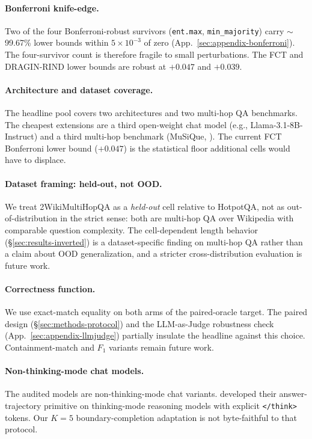 \documentclass[11pt]{article}
\begin{document}
\paragraph{Bonferroni knife-edge.} Two of the four Bonferroni-robust survivors (\texttt{ent.max}, \texttt{min\_majority}) carry $\sim$99.67\% lower bounds within $5{\times}10^{-3}$ of zero (App.~\ref{sec:appendix-bonferroni}). The four-survivor count is therefore fragile to small perturbations. The FCT and DRAGIN-RIND lower bounds are robust at $+0.047$ and $+0.039$.

\paragraph{Architecture and dataset coverage.} The headline pool covers two architectures and two multi-hop QA benchmarks. The cheapest extensions are a third open-weight chat model (e.g., Llama-3.1-8B-Instruct) and a third multi-hop benchmark (MuSiQue, \citealp{trivedi_musique_2022}). The current FCT Bonferroni lower bound ($+0.047$) is the statistical floor additional cells would have to displace.

\paragraph{Dataset framing: held-out, not OOD.} We treat 2WikiMultiHopQA as a \emph{held-out} cell relative to HotpotQA, not as out-of-distribution in the strict sense: both are multi-hop QA over Wikipedia with comparable question complexity. The cell-dependent length behavior (\S\ref{sec:results-inverted}) is a dataset-specific finding on multi-hop QA rather than a claim about OOD generalization, and a stricter cross-distribution evaluation is future work.

\paragraph{Correctness function.} We use exact-match equality on both arms of the paired-oracle target. The paired design (\S\ref{sec:methods-protocol}) and the LLM-as-Judge robustness check (App.~\ref{sec:appendix-llmjudge}) partially insulate the headline against this choice. Containment-match and $F_1$ variants remain future work.

\paragraph{Non-thinking-mode chat models.} The audited models are non-thinking-mode chat variants. \citet{datta_large_2026} developed their answer-trajectory primitive on thinking-mode reasoning models with explicit \texttt{</think>} tokens. Our $K{=}5$ boundary-completion adaptation is not byte-faithful to that protocol.
\end{document}
